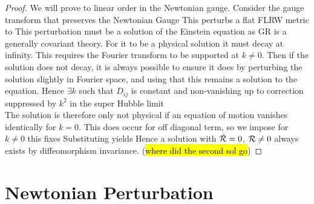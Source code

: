 \documentclass{article}
\begin{document}
\begin{proof}
We will prove to linear order in the Newtonian gauge. 
Consider the gauge transform that preserves the Newtonian Gauge 
This perturbs a flat FLRW metric to 
This perturbation must be a solution of the Einstein equation as GR is a generally covariant theory. For it to be a physical solution it must decay at infinity. This requires the Fourier transform to be supported at $k \neq 0  $. Then if the solution does not decay, it is always possible to ensure it does by perturbing the solution slightly in Fourier space, and using that this remains a solution to the equation. Hence $\exists k$ such that $D_{ij}$ is constant and non-vanishing up to correction suppressed by $k^2$ in the super Hubble limit  \\
The solution is therefore only not physical if an equation of motion vanishes identically for $k=0$. This does occur for off diagonal term, so we impose for $k\neq 0$
this fixes 
Substituting yields 
Hence a solution with $\dot{\mathcal{R}}=0$, $\mathcal{R}\neq 0$ always exists by diffeomorphism invariance. (\hl{where did the second sol go})

\end{proof}


\section{Newtonian Perturbation}
\end{document}
